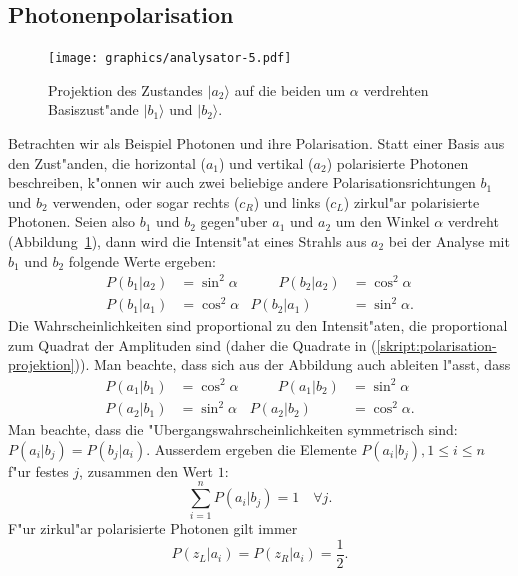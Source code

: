 \subsection{Photonenpolarisation}
\begin{figure}
\centering
\texttt{[image: graphics/analysator-5.pdf]}
\caption{Projektion des Zustandes $|a_2\rangle$ auf die beiden
um $\alpha$ verdrehten Basiszust"ande $|b_1\rangle$ und $|b_2\rangle$.
\label{skript:polarisation-rotation}}
\end{figure}
%
Betrachten wir als Beispiel Photonen und ihre Polarisation. 
Statt einer Basis aus den Zust"anden, die horizontal ($a_1$) und vertikal
($a_2$) polarisierte Photonen beschreiben, k"onnen wir auch zwei 
beliebige andere Polarisationsrichtungen $b_1$ und $b_2$ verwenden,
oder sogar rechts ($c_R$) und links ($c_L$) zirkul"ar polarisierte Photonen.
Seien also $b_1$ und $b_2$ gegen"uber $a_1$ und $a_2$ um den Winkel
$\alpha$ verdreht (Abbildung~\ref{skript:polarisation-rotation}),
dann wird die Intensit"at eines Strahls aus $a_2$
bei der Analyse mit $b_1$ und $b_2$ folgende Werte ergeben:
\begin{equation}
\begin{aligned}
P(b_1|a_2)&=\sin^2\alpha
&\qquad
P(b_2|a_2)&=\cos^2\alpha
\\
P(b_1|a_1)&=\cos^2\alpha
&
P(b_2|a_1)&=\sin^2\alpha.
\end{aligned}
\label{skript:polarisation-projektion}
\end{equation}
Die Wahrscheinlichkeiten sind proportional zu den Intensit"aten,
die proportional zum Quadrat der Amplituden sind (daher die Quadrate
in (\ref{skript:polarisation-projektion})).
Man beachte, dass sich aus der Abbildung auch ableiten l"asst, dass
\begin{equation}
\begin{aligned}
P(a_1|b_1)&=\cos^2\alpha
&\qquad
P(a_1|b_2)&=\sin^2\alpha
\\
P(a_2|b_1)&=\sin^2\alpha
&
P(a_2|b_2)&=\cos^2\alpha.
\end{aligned}
\label{skript:polarisation-projektion-inverse}
\end{equation}
%
Man beachte, dass die "Ubergangswahrscheinlichkeiten
symmetrisch sind: $P(a_i|b_j)=P(b_j|a_i)$.
Ausserdem ergeben die Elemente $P(a_i|b_j), 1\le i\le n$ f"ur festes $j$,
zusammen den Wert $1$:
\[
\sum_{i=1}^nP(a_i|b_j)=1\quad\forall j.
\]
F"ur zirkul"ar polarisierte Photonen gilt immer 
\[
P(z_L|a_i)=P(z_R|a_i)=\frac12.
\]
